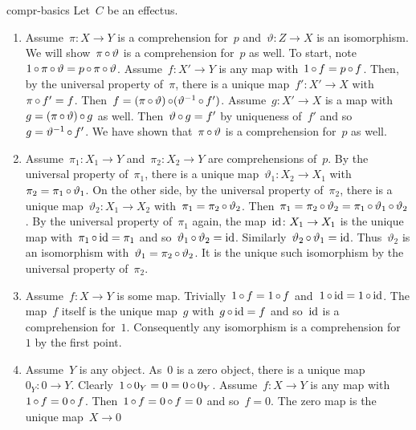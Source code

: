 \begin{solution}{compr-basics}%
Let~$C$ be an effectus.
 \begin{enumerate}
    \item
Assume~$\pi \colon X \to Y$ is a comprehension for~$p$
    and~$\vartheta\colon Z \to X$ is an isomorphism.
We will show~$\pi \mathop{\circ} \vartheta$ is a comprehension for~$p$
    as well.
To start, note~$1 \mathop{\circ} \pi \mathop{\circ} \vartheta  = p \mathop{\circ} \pi \mathop{\circ} \vartheta$.
Assume~$f\colon X' \to Y$ is any map with~$1 \mathop{\circ} f = p\mathop{\circ} f$.
Then, by the universal property of~$\pi$, there is a unique map~$f' \colon X' \to X$
    with~$\pi \mathop{\circ} f' = f$.
         Then~$f = (\pi \mathop{\circ} \vartheta) \mathop{\circ} (\vartheta^{-1} \mathop{\circ} f')$.
Assume~$g \colon X' \to X$ is a map with~$g = (\pi \mathop{\circ} \vartheta) \mathop{\circ} g$
    as well.
Then~$\vartheta \mathop{\circ} g = f'$ by uniqueness of~$f'$ and so~$
    g = \vartheta^{-1} \mathop{\circ} f'$.
We have shown that~$\pi \mathop{\circ} \vartheta$ is a comprehension for~$p$ as well.
\item
Assume~$\pi_1 \colon X_1 \to Y$ and~$\pi_2 \colon X_2 \to Y$
    are comprehensions of~$p$.
By the universal property of~$\pi_1$, there is a unique map~$\vartheta_1\colon X_2 \to X_1$
    with~$\pi_2 = \pi_1 \mathop{\circ} \vartheta_1$.
On the other side, by the universal property of~$\pi_2$,
     there is a unique map~$\vartheta_2\colon X_1 \to X_2$
    with~$\pi_1 = \pi_2 \mathop{\circ} \vartheta_2$.
Then~$\pi_1 = \pi_2 \mathop{\circ} \vartheta_2 = \pi_1 \mathop{\circ} \vartheta_1 \mathop{\circ} \vartheta_2$.
By the universal property of~$\pi_1$ again, the map~$\mathrm{id} \colon X_1 \to X_1$
    is the unique map with~$\pi_1 \mathop{\circ} \mathrm{id} = \pi_1$
         and so~$\vartheta_1 \mathop{\circ} \vartheta_2 = \mathrm{id}$.
    Similarly~$\vartheta_2 \mathop{\circ} \vartheta_1 = \mathrm{id}$.
    Thus~$\vartheta_2$ is an isomorphism with~$\vartheta_1 = \pi_2 \mathop{\circ} \vartheta_2$.
        It is the unique such isomorphism by the universal property of~$\pi_2$.
\item
Assume~$f\colon X \to Y$ is some map.  Trivially~$1 \mathop{\circ} f = 1 \mathop{\circ} f$ and~$1 \mathop{\circ} \mathrm{id} = 1 \mathop{\circ} \mathrm{id}$.
The map~$f$ itself is the unique map~$g$ with~$g \mathop{\circ} \mathrm{id}  = f$
    and so~$\mathrm{id}$ is a comprehension for~$1$.
    Consequently any isomorphism is a comprehension for~$1$ by the first point.
\item
Assume~$Y$ is any object.
As~$0$ is a zero object, there is a unique map~$0_Y \colon 0 \to Y$.
Clearly~$1 \mathop{\circ} 0_Y = 0 = 0 \mathop{\circ} 0_Y$.
Assume~$f\colon X \to Y$ is any map with~$1 \mathop{\circ} f = 0\mathop{\circ} f$.
Then~$1 \mathop{\circ} f= 0 \mathop{\circ} f = 0$ and so~$f=0$.
The zero map is the unique map~$ X \to 0$

\end{enumerate}
\end{solution}
